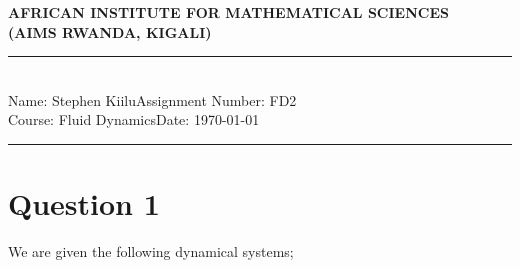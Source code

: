 \documentclass[12pt,a4paper]{article}
\newcommand{\student}{Stephen Kiilu}
\newcommand{\course}{Fluid Dynamics}
\newcommand{\assignment}{FD2}
\begin{document}
\thispagestyle{empty}
\begin{center}
\textbf{AFRICAN INSTITUTE FOR MATHEMATICAL SCIENCES \\[0.5cm]
(AIMS RWANDA, KIGALI)}
\vspace{1.0cm}
\end{center}

\noindent
\rule{17cm}{0.2cm}\\[0.3cm]
Name: \student \hfill Assignment Number: \assignment\\[0.1cm]
Course: \course \hfill Date: \today\\
\rule{17cm}{0.05cm}
\vspace{1.0cm}

\section*{Question 1}
We are given the following dynamical systems;
\end{document}
